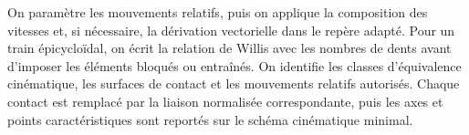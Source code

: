 \begin{corrigebox}[Corrigé]
On paramètre les mouvements relatifs, puis on applique la composition des vitesses et, si nécessaire, la dérivation vectorielle dans le repère adapté. Pour un train épicycloïdal, on écrit la relation de Willis avec les nombres de dents avant d'imposer les éléments bloqués ou entraînés.
On identifie les classes d'équivalence cinématique, les surfaces de contact et les mouvements relatifs autorisés. Chaque contact est remplacé par la liaison normalisée correspondante, puis les axes et points caractéristiques sont reportés sur le schéma cinématique minimal.
\end{corrigebox}
